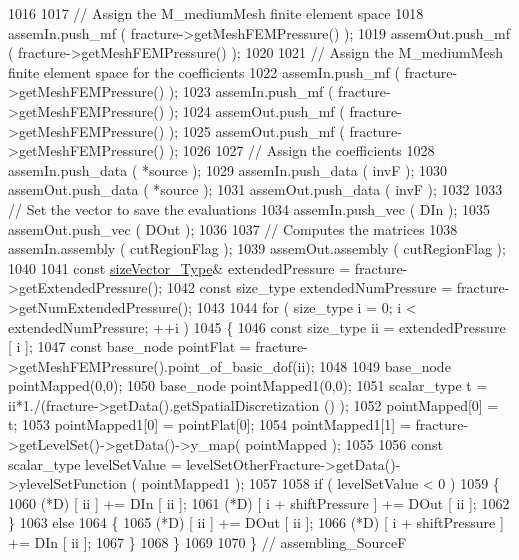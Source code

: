 \begin{DoxyCode}
1016 
1017     \textcolor{comment}{// Assign the M\_mediumMesh finite element space}
1018     assemIn.push\_mf ( fracture->getMeshFEMPressure() );
1019     assemOut.push\_mf ( fracture->getMeshFEMPressure() );
1020 
1021     \textcolor{comment}{// Assign the M\_mediumMesh finite element space for the coefficients}
1022     assemIn.push\_mf ( fracture->getMeshFEMPressure() );
1023     assemIn.push\_mf ( fracture->getMeshFEMPressure() );
1024     assemOut.push\_mf ( fracture->getMeshFEMPressure() );
1025     assemOut.push\_mf ( fracture->getMeshFEMPressure() );
1026 
1027     \textcolor{comment}{// Assign the coefficients}
1028     assemIn.push\_data ( *source );
1029     assemIn.push\_data ( invF );
1030     assemOut.push\_data ( *source );
1031     assemOut.push\_data ( invF );
1032 
1033     \textcolor{comment}{// Set the vector to save the evaluations}
1034     assemIn.push\_vec ( DIn );
1035     assemOut.push\_vec ( DOut );
1036 
1037     \textcolor{comment}{// Computes the matrices}
1038     assemIn.assembly ( cutRegionFlag );
1039     assemOut.assembly ( cutRegionFlag );
1040 
1041     \textcolor{keyword}{const} \hyperlink{Core_8h_a83c51913d041a5001e8683434c09857f}{sizeVector\_Type}& extendedPressure = fracture->getExtendedPressure();
1042     \textcolor{keyword}{const} size\_type extendedNumPressure = fracture->getNumExtendedPressure();
1043 
1044     \textcolor{keywordflow}{for} ( size\_type i = 0; i < extendedNumPressure; ++i )
1045     \{
1046         \textcolor{keyword}{const} size\_type ii = extendedPressure [ i ];
1047         \textcolor{keyword}{const} base\_node pointFlat = fracture->getMeshFEMPressure().point\_of\_basic\_dof(ii);
1048         
1049         base\_node pointMapped(0,0);
1050         base\_node pointMapped1(0,0);
1051         scalar\_type t = ii*1./(fracture->getData().getSpatialDiscretization () );
1052         pointMapped[0] = t;
1053         pointMapped1[0] = pointFlat[0];
1054         pointMapped1[1] = fracture->getLevelSet()->getData()->y\_map( pointMapped );
1055         
1056         \textcolor{keyword}{const} scalar\_type levelSetValue = levelSetOtherFracture->getData()->ylevelSetFunction ( 
      pointMapped1 );
1057 
1058         \textcolor{keywordflow}{if} ( levelSetValue < 0 )
1059         \{
1060             (*D) [ ii ] += DIn [ ii ];
1061             (*D) [ i + shiftPressure ] += DOut [ ii ];
1062         \}
1063         \textcolor{keywordflow}{else}
1064         \{
1065             (*D) [ ii ] += DOut [ ii ];
1066             (*D) [ i + shiftPressure ] += DIn [ ii ];
1067         \}
1068     \}
1069 
1070 \} \textcolor{comment}{// assembling\_SourceF}
\end{DoxyCode}
